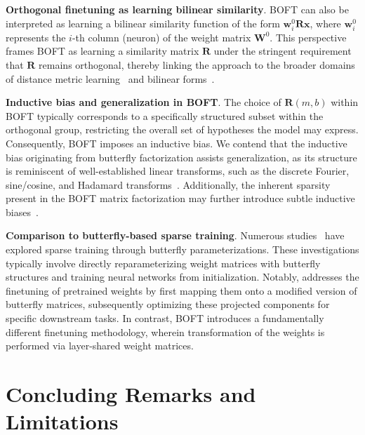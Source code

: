 \textbf{Orthogonal finetuning as learning bilinear similarity}. BOFT can also be interpreted as learning a bilinear similarity function of the form $\bm{w}^0_i\bm{R}\bm{x}$, where $\bm{w}^0_i$ represents the $i$-th column (neuron) of the weight matrix $\bm{W}^0$. This perspective frames BOFT as learning a similarity matrix $\bm{R}$ under the stringent requirement that $\bm{R}$ remains orthogonal, thereby linking the approach to the broader domains of distance metric learning~\cite{xing2002distance} and bilinear forms~\cite{roman2005advanced}.

\textbf{Inductive bias and generalization in BOFT}. The choice of $\bm{R}(m,b)$ within BOFT typically corresponds to a specifically structured subset within the orthogonal group, restricting the overall set of hypotheses the model may express. Consequently, BOFT imposes an inductive bias. We contend that the inductive bias originating from butterfly factorization assists generalization, as its structure is reminiscent of well-established linear transforms, such as the discrete Fourier, sine/cosine, and Hadamard transforms~\cite{dao2019kaleidoscope}. Additionally, the inherent sparsity present in the BOFT matrix factorization may further introduce subtle inductive biases~\cite{gunasekar2017implicit,li2018algorithmic,liu2019neural}.

\textbf{Comparison to butterfly-based sparse training}. Numerous studies~\cite{dao2019learning,dao2019kaleidoscope,chen2022pixelated,dao2022monarch} have explored sparse training through butterfly parameterizations. These investigations typically involve directly reparameterizing weight matrices with butterfly structures and training neural networks from initialization. Notably, \cite{dao2022monarch} addresses the finetuning of pretrained weights by first mapping them onto a modified version of butterfly matrices, subsequently optimizing these projected components for specific downstream tasks. In contrast, BOFT introduces a fundamentally different finetuning methodology, wherein transformation of the weights is performed via layer-shared weight matrices.



\section{Concluding Remarks and Limitations}

